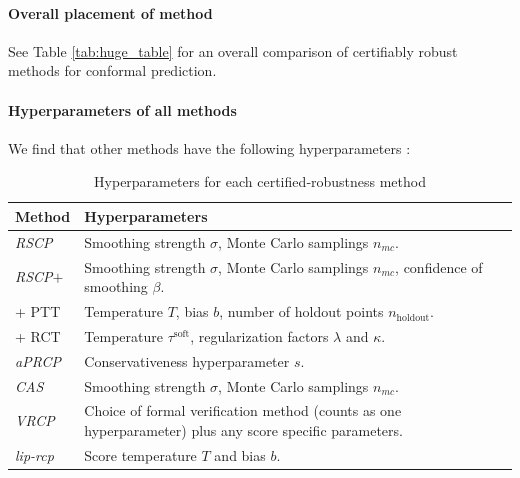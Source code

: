 \paragraph{Overall placement of method} See Table \ref{tab:huge_table} for an overall comparison of certifiably robust methods for conformal prediction.

\paragraph{Hyperparameters of all methods} \label{par:hyperparams} We find that other methods have the following hyperparameters : 

\begin{table}[ht]
  \centering
  \begin{tabular}{@{}ll@{}}
    \toprule
    \textbf{Method} & \textbf{Hyperparameters} \\
    \midrule
    \emph{RSCP}           & Smoothing strength \(\sigma\), Monte Carlo samplings \(n_{mc}\). \\
    \emph{RSCP\(+\)}      & Smoothing strength \(\sigma\), Monte Carlo samplings \(n_{mc}\), confidence of smoothing \(\beta\). \\
    +  PTT         & Temperature \(T\), bias \(b\), number of holdout points \(n_{\text{holdout}}\). \\
    +  RCT         & Temperature \(\tau^{\mathrm{soft}}\), regularization factors \(\lambda\) and \(\kappa\). \\
    \emph{aPRCP}          & Conservativeness hyperparameter \(s\). \\
    \emph{CAS}            & Smoothing strength \(\sigma\), Monte Carlo samplings \(n_{mc}\). \\
    \emph{VRCP}           & Choice of formal verification method (counts as one hyperparameter) plus any  score specific parameters. \\
    \emph{lip-rcp} & Score temperature \(T\) and bias \(b\). \\
    \bottomrule
  \end{tabular}
  \caption{Hyperparameters for each certified‐robustness method}
  \label{tab:method_hyperparams}
\end{table}



